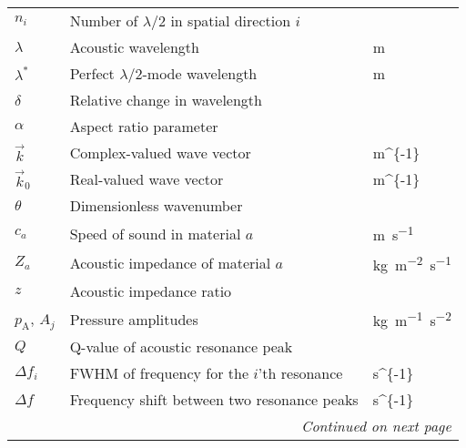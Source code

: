 \begin{center}
\begin{tabular}{p{2cm}p{8cm}p{3cm}}
$n_i$			  	      	& Number of $\lambda/2$ in spatial direction $i$& \SI{}{} \\
$\lambda$			      	& Acoustic wavelength							& \SI{m}{} \\
$\lambda^*$			      	& Perfect $\lambda/2$-mode wavelength			& \SI{m}{} \\
$\delta$			      	& Relative change in wavelength		    		& \SI{}{} \\
$\alpha$		 			& Aspect ratio parameter				    	& \SI{}{} \\
$\vec{k}$			      	& Complex-valued wave vector					& \SI{m^{-1}}{} \\
$\vec{k}_0$			      	& Real-valued wave vector						& \SI{m^{-1}}{} \\
$\theta$		 			& Dimensionless wavenumber				    	& \SI{}{} \\
$c_a$			          	& Speed of sound in material $a$				& \SI{m}{s^{-1}} \\
$Z_a$			          	& Acoustic impedance of material $a$			& \SI{kg}{m^{-2}s^{-1}} \\
$z$			              	& Acoustic impedance ratio				        & \SI{}{} \\
$p_\mathrm{A}$, $A_j$		& Pressure amplitudes					        & \SI{kg}{m^{-1}s^{-2}} \\

$Q$							& Q-value of acoustic resonance	peak		    & \SI{}{} \\
$\Delta f_i$			    & FWHM of frequency for the $i$'th resonance	& \SI{s^{-1}}{} \\
$\Delta f$			        & Frequency shift between two resonance peaks	& \SI{s^{-1}}{} \\\hline
							& \multicolumn{2}{r}{\textit{Continued on next page}}	
\end{tabular}
\end{center}


